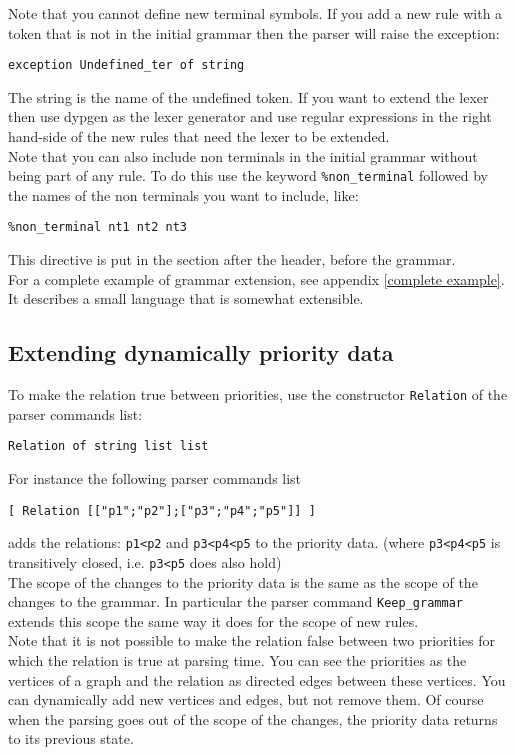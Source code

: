 \documentclass[12pt]{article}
\begin{document}
{Note that you cannot define new terminal symbols. If you add a new rule with a token that is not in the initial grammar then the parser will raise the exception:
\begin{verbatim}
exception Undefined_ter of string
\end{verbatim}
The string is the name of the undefined token. If you want to extend the lexer then use dypgen as the lexer generator and use regular expressions in the right hand-side of the new rules that need the lexer to be extended.\\

Note that you can also include non terminals in the initial grammar without being part of any rule. To do this use the keyword \verb|%non_terminal| followed by the names of the non terminals you want to include, like:
\begin{verbatim}
%non_terminal nt1 nt2 nt3
\end{verbatim}
This directive is put in the section after the header, before the grammar.\\

For a complete example of grammar extension, see appendix \ref{complete example}. It describes a small language that is somewhat extensible.

\subsection{Extending dynamically priority data}\label{dynamic priority}

To make the relation true between priorities, use the constructor \verb|Relation| of the parser commands list:
\begin{verbatim}
Relation of string list list
\end{verbatim}
For instance the following parser commands list
\begin{verbatim}
[ Relation [["p1";"p2"];["p3";"p4";"p5"]] ]
\end{verbatim}
adds the relations: \verb|p1<p2| and \verb|p3<p4<p5| to the priority data. (where \verb|p3<p4<p5| is transitively closed, i.e. \verb|p3<p5| does also hold)\\

The scope of the changes to the priority data is the same as the scope of the changes to the grammar. In particular the parser command \verb|Keep_grammar| extends this scope the same way it does for the scope of new rules.\\

Note that it is not possible to make the relation false between two priorities for which the relation is true at parsing time. You can see the priorities as the vertices of a graph and the relation as directed edges between these vertices. You can dynamically add new vertices and edges, but not remove them. Of course when the parsing goes out of the scope of the changes, the priority data returns to its previous state.\\

}
\end{document}
